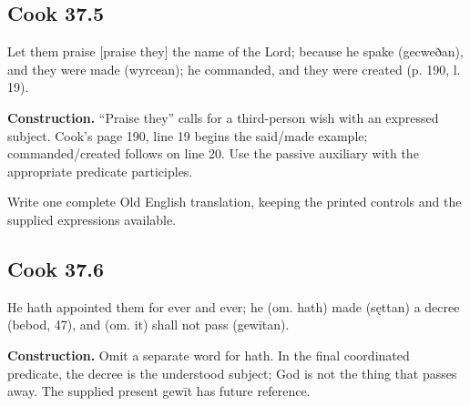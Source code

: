 \par\begin{minipage}{\linewidth}\raggedright
\subsection*{Cook 37.5}

Let them praise [praise they] the name of the Lord; because he spake (gecweðan), and they were made (wyrcean); he commanded, and they were created (p. 190, l. 19).

\textbf{Construction.} “Praise they” calls for a third-person wish with an expressed subject. Cook’s page 190, line 19 begins the said/\allowbreak{}made example; commanded/\allowbreak{}created follows on line 20. Use the passive auxiliary with the appropriate predicate participles.

Write one complete Old English translation, keeping the printed controls and the supplied expressions available.

\end{minipage}\par\addvspace{4pt}

\par\begin{minipage}{\linewidth}\raggedright
\subsection*{Cook 37.6}

He hath appointed them for ever and ever; he (om. hath) made (sęttan) a decree (bebod, 47), and (om. it) shall not pass (gewītan).

\end{minipage}\par\addvspace{4pt}

\textbf{Construction.} Omit a separate word for hath. In the final coordinated predicate, the decree is the understood subject; God is not the thing that passes away. The supplied present gewīt has future reference.

